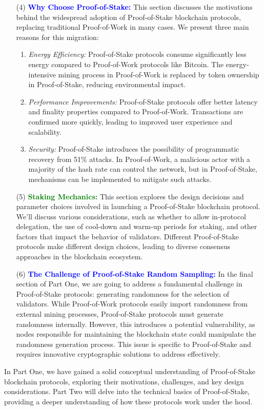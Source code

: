 \begin{enumerate}[label=(\arabic*)]
  \item[(4)] \textcolor{blue}{\textbf{Why Choose Proof-of-Stake:}} This section discusses the motivations behind the widespread adoption of Proof-of-Stake blockchain protocols, replacing traditional Proof-of-Work in many cases. We present three main reasons for this migration:
  \begin{enumerate}
      \item \textit{Energy Efficiency:} Proof-of-Stake protocols consume significantly less energy compared to Proof-of-Work protocols like Bitcoin. The energy-intensive mining process in Proof-of-Work is replaced by token ownership in Proof-of-Stake, reducing environmental impact.
      \item \textit{Performance Improvements:} Proof-of-Stake protocols offer better latency and finality properties compared to Proof-of-Work. Transactions are confirmed more quickly, leading to improved user experience and scalability.
      \item \textit{Security:} Proof-of-Stake introduces the possibility of programmatic recovery from 51\% attacks. In Proof-of-Work, a malicious actor with a majority of the hash rate can control the network, but in Proof-of-Stake, mechanisms can be implemented to mitigate such attacks.
  \end{enumerate}

  \item[(5)] \textcolor{green}{\textbf{Staking Mechanics:}} This section explores the design decisions and parameter choices involved in launching a Proof-of-Stake blockchain protocol. We'll discuss various considerations, such as whether to allow in-protocol delegation, the use of cool-down and warm-up periods for staking, and other factors that impact the behavior of validators. Different Proof-of-Stake protocols make different design choices, leading to diverse consensus approaches in the blockchain ecosystem.

  \item[(6)] \textcolor{blue}{\textbf{The Challenge of Proof-of-Stake Random Sampling:}} In the final section of Part One, we are going to address a fundamental challenge in Proof-of-Stake protocols: generating randomness for the selection of validators. While Proof-of-Work protocols easily import randomness from external mining processes, Proof-of-Stake protocols must generate randomness internally. However, this introduces a potential vulnerability, as nodes responsible for maintaining the blockchain state could manipulate the randomness generation process. This issue is specific to Proof-of-Stake and requires innovative cryptographic solutions to address effectively.

\end{enumerate}
In Part One, we have gained a solid conceptual understanding of Proof-of-Stake blockchain protocols, exploring their motivations, challenges, and key design considerations. Part Two will delve into the technical basics of Proof-of-Stake, providing a deeper understanding of how these protocols work under the hood.

